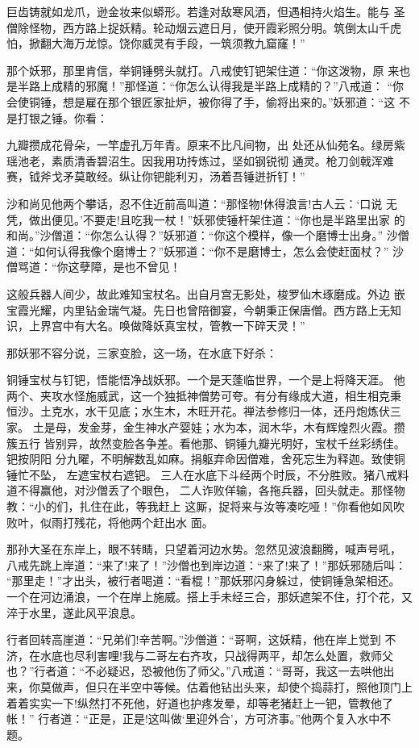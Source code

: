 巨齿铸就如龙爪，逊金妆来似蟒形。若逢对敌寒风洒，但遇相持火焰生。能与
圣僧除怪物，西方路上捉妖精。轮动烟云遮日月，使开霞彩照分明。筑倒太山千虎
怕，掀翻大海万龙惊。饶你威灵有手段，一筑须教九窟窿！”

那个妖邪，那里肯信，举铜锤劈头就打。八戒使钉钯架住道：“你这泼物，原
来也是半路上成精的邪魔！”那怪道：“你怎么认得我是半路上成精的？”八戒道：
“你会使铜锤，想是雇在那个银匠家扯炉，被你得了手，偷将出来的。”妖邪道：“这
不是打银之锤。你看：

九瓣攒成花骨朵，一竿虚孔万年青。原来不比凡间物，出
处还从仙苑名。绿房紫瑶池老，素质清香碧沼生。因我用功抟炼过，坚如钢锐彻
通灵。枪刀剑戟浑难赛，钺斧戈矛莫敢经。纵让你钯能利刃，汤着吾锤迸折钉！”

沙和尚见他两个攀话，忍不住近前高叫道：“那怪物!休得浪言!古人云：‘口说
无凭，做出便见。’不要走!且吃我一杖！”妖邪使锤杆架住道：“你也是半路里出家
的和尚。”沙僧道：“你怎么认得？”妖邪道：“你这个模样，像一个磨博士出身。”
沙僧道：“如何认得我像个磨博士？”妖邪道：“你不是磨博士，怎么会使赶面杖？”
沙僧骂道：“你这孽障，是也不曾见！

这般兵器人间少，故此难知宝杖名。出自月宫无影处，梭罗仙木琢磨成。外边
嵌宝霞光耀，内里钻金瑞气凝。先日也曾陪御宴，今朝秉正保唐僧。西方路上无知
识，上界宫中有大名。唤做降妖真宝杖，管教一下碎天灵！”

那妖邪不容分说，三家变脸，这一场，在水底下好杀：

铜锤宝杖与钉钯，悟能悟净战妖邪。一个是天蓬临世界，一个是上将降天涯。
他两个、夹攻水怪施威武，这一个独抵神僧势可夸。有分有缘成大道，相生相克秉
恒沙。土克水，水干见底；水生木，木旺开花。禅法参修归一体，还丹炮炼伏三家。
土是母，发金芽，金生神水产婴娃；水为本，润木华，木有辉煌烈火霞。攒簇五行
皆别异，故然变脸各争差。看他那、铜锤九瓣光明好，宝杖千丝彩绣佳。钯按阴阳
分九曜，不明解数乱如麻。捐躯弃命因僧难，舍死忘生为释迦。致使铜锤忙不坠，
左遮宝杖右遮钯。
三人在水底下斗经两个时辰，不分胜败。猪八戒料道不得赢他，对沙僧丢了个眼色，
二人诈败佯输，各拖兵器，回头就走。那怪物教：“小的们，扎住在此，等我赶上
这厮，捉将来与汝等凑吃哑！”你看他如风吹败叶，似雨打残花，将他两个赶出水
面。

那孙大圣在东岸上，眼不转睛，只望着河边水势。忽然见波浪翻腾，喊声号吼，
八戒先跳上岸道：“来了!来了！”沙僧也到岸边道：“来了!来了！”那妖邪随后叫：
“那里走！”才出头，被行者喝道：“看棍！”那妖邪闪身躲过，使铜锤急架相还。
一个在河边涌浪，一个在岸上施威。搭上手未经三合，那妖遮架不住，打个花，又
淬于水里，遂此风平浪息。

行者回转高崖道：“兄弟们!辛苦啊。”沙僧道：“哥啊，这妖精，他在岸上觉到
不济，在水底也尽利害哩!我与二哥左右齐攻，只战得两平，却怎么处置，救师父
也？”行者道：“不必疑迟，恐被他伤了师父。”八戒道：“哥哥，我这一去哄他出
来，你莫做声，但只在半空中等候。估着他钻出头来，却使个捣蒜打，照他顶门上
着着实实一下!纵然打不死他，好道也护疼发晕，却等老猪赶上一钯，管教他了帐！”
行者道：“正是，正是!这叫做‘里迎外合’，方可济事。”他两个复入水中不题。


